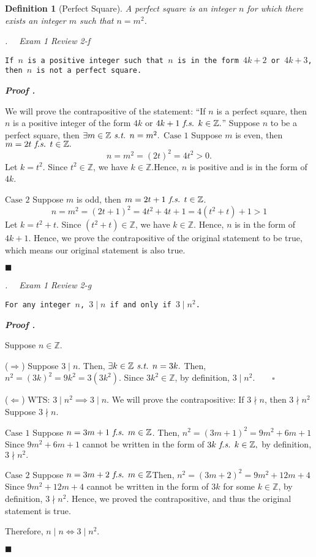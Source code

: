 \documentclass[11pt,letter]{article}
\newcounter{nq}[section]
\newcounter{np}[section]
\newtheorem{df}{Definition}[section]
\newenvironment*{p}{\par\noindent\textbf{\textit{Proof \stepcounter{np}\thenp. }}\par}{\par\hfill $\blacksquare$\par}
\newenvironment*{q}[1]{\noindent\emph{\thesection.\stepcounter{nq}\thenq$\quad $ #1}\par\noindent\texttt}{}
\def\Z{{\mathbb{Z}}}
\def\st{\emph{ s.t. }}
\def\fs{\emph{ f.s. }}
\begin{document}
\begin{df}[Perfect Square]
A perfect square is an integer $n$ for which there exists an integer $m$ such that $n=m^2$. 
\end{df}

\begin{framed}\begin{q}
	{Exam 1 Review 2-f}
	{If $n$ is a positive integer such that $n$ is in the form $4k+2$ or $4k+3$, then $n$ is not a perfect square.}
\end{q}\end{framed}
\begin{p}
	We will prove the contrapositive of the statement: ``If $n$ is a perfect square, then $n$ is a positive integer of the form $4k$ or $4k+1\fs k\in\Z.$'' Suppose $n$ to be a perfect square, then $\exists m\in\Z\st n=m^2.$ $\boxed{\text{Case }1}$ Suppose $m$ is even, then $m=2t\fs t\in\Z.$\[n=m^2=(2t)^2=4t^2>0.\] Let $k=t^2$. Since $t^2\in\Z$, we have $k\in\Z.$Hence, $n$ is positive and is in the form of $4k$.\par 
	$\boxed{\text{Case }2}$ Suppose $m$ is odd, then $m=2t+1\fs t\in\Z$.\[n=m^2=(2t+1)^2=4t^2+4t+1=4(t^2+t)+1>1\] Let $k=t^2+t$. Since $(t^2+t)\in\Z$, we have $k\in\Z.$ Hence, $n$ is in the form of $4k+1$. Hence, we prove the contrapositive of the original statement to be true, which means our original statement is also true.	
\end{p}

\begin{framed}\begin{q}
	{Exam 1 Review 2-g}
	{For any integer $n$, $3\mid n$ if and only if $3\mid n^2$.}
\end{q}\end{framed}
\begin{p}
	Suppose $n\in\Z$.\par
	($\Rightarrow$) Suppose $3\mid n$. Then, $\exists k\in\Z\st n=3k.$ Then, $n^2=(3k)^2=9k^2=3(3k^2).$ Since $3k^2\in\Z$, by definition, $3\mid n^2.\qquad\square$\par
	($\Leftarrow$) WTS: $3\mid n^2\implies3\mid n$. We will prove the contrapositive: If $3\nmid n$, then $3\nmid n^2$ Suppose $3\nmid n.$ \par\hspace{5mm}
		$\boxed{\text{Case }1}$ Suppose $n=3m+1\fs m\in\Z$. Then, $n^2=(3m+1)^2=9m^2+6m+1$ Since $9m^2+6m+1$ cannot be written in the form of $3k\fs k\in\Z,$ by definition, $3\nmid n^2.$\par\hspace{5mm}
		$\boxed{\text{Case }2}$ Suppose $n=3m+2\fs m\in\Z$Then, $n^2=(3m+2)^2=9m^2+12m+4$Since $9m^2+12m+4$ cannot be written in the form of $3k$ for some $k\in\Z$, by definition, $3\nmid n^2.$ Hence, we proved the contrapositive, and thus the original statement is true.\par 
	Therefore, $n\mid n\iff 3\mid n^2.$
\end{p}
\end{document}
